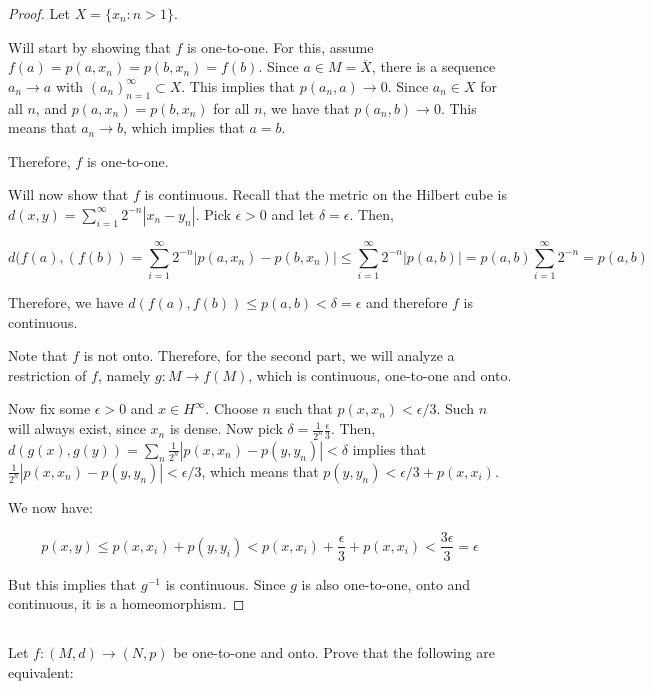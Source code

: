 \begin{proof}

Let $X = \{x_n : n > 1\}$.

Will start by showing that $f$ is one-to-one. For this, 
assume $f(a) = p(a,x_n) = p(b,x_n) = f(b)$. Since $a \in M = \overline{X}$, there is a sequence $a_n \rightarrow a$ with $(a_n)_{n=1}^\infty \subset X$. This implies that $p(a_n, a) \rightarrow 0$. Since $a_n \in X$ for all $n$, and $p(a,x_n) = p(b, x_n)$ for all $n$, we have that $p(a_n, b) \rightarrow 0$. This means that $a_n \rightarrow b$, which implies that $a = b$.

Therefore, $f$ is one-to-one.

\vspace{1em}

Will now show that $f$ is continuous. Recall that the metric on the Hilbert cube is $d(x,y) = \sum_{i=1}^\infty 2^{-n}|x_n - y_n|$. Pick $\epsilon > 0$ and let $\delta = \epsilon$. Then,

$$ d(f(a),(f(b)) =
\sum_{i=1}^\infty 2^{-n}|p(a,x_n) - p(b,x_n)|
\leq \sum_{i=1}^\infty 2^{-n} |p(a,b)| = p(a,b) \sum_{i=1}^\infty 2^{-n} = p(a,b)$$

Therefore, we have $d(f(a), f(b)) \leq p(a,b) < \delta = \epsilon$ and therefore $f$ is continuous.

\vspace{2em}
\newpage
Note that $f$ is not onto. Therefore, for the second part, we will analyze a restriction of $f$, namely $g:M \rightarrow f(M)$, which is continuous, one-to-one and onto.

Now fix some $\epsilon > 0$ and $x \in H^\infty$. Choose $n$ such that $p(x, x_n) < \epsilon / 3$. Such $n$ will always exist, since ${x_n}$ is dense. Now pick $\delta = \frac{1}{2^n} \frac{\epsilon}{3}$. Then, $d(g(x), g(y)) = \sum_{n} \frac{1}{2^n}|p(x, x_n) - p(y, y_n)| < \delta$ implies that $\frac{1}{2^n}|p(x, x_n) - p(y, y_n)| < \epsilon / 3$, which means that $p(y, y_n) < \epsilon / 3 + p(x, x_i)$.

We now have:

$$p(x,y) \leq p(x, x_i) + p(y, y_i) < p(x, x_i) + \frac{\epsilon}{3} + p(x, x_i) < \frac{3\epsilon}{3} = \epsilon$$

But this implies that $g^{-1}$ is continuous. Since $g$ is also one-to-one, onto and continuous, it is a homeomorphism.

\end{proof}

\subsection{} Let $f:(M,d) \rightarrow (N, p)$ be one-to-one and onto. Prove that the following are equivalent:

